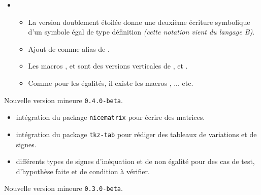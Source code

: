 \documentclass[12pt,a4paper]{book}
\begin{document}
\begin{description}
\begin{itemize}[itemsep=.5em]


    \item {}
    \begin{itemize}[itemsep=.5em]
        \item La version doublement étoilée  donne une deuxième écriture symbolique d'un symbole égal de type définition \emph{(cette notation vient du langage B)}.

        \item Ajout de  comme alias de .

        \item Les macros ,  et  sont des versions verticales de ,  et .

        \item Comme pour les égalités, il existe les macros ,  ... etc.
    \end{itemize}
\end{itemize}

\end{description}\begin{description}
\medskip
\item[2019-09-06] Nouvelle version mineure \verb+0.4.0-beta+.

\begin{itemize}[itemsep=.5em]
    \item {}
          intégration du package \verb+nicematrix+ pour écrire des matrices.




    \item {}
          intégration du package \verb+tkz-tab+ pour rédiger des tableaux de variations et de signes.




    \item {}
          différents types de signes d'inéquation et de non égalité pour des cas de test, d'hypothèse faite et de condition à vérifier.

\end{itemize}

\end{description}\begin{description}
\medskip
\item[2019-07-23] Nouvelle version mineure \verb+0.3.0-beta+.


\end{description}
\end{document}
